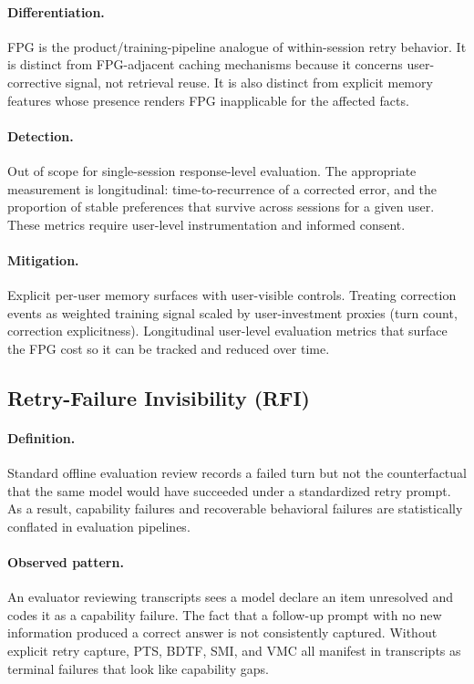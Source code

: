 \documentclass[11pt]{article}
\begin{document}
\paragraph{Differentiation.} FPG is the product/training-pipeline analogue of within-session retry behavior. It is distinct from FPG-adjacent caching mechanisms because it concerns user-corrective signal, not retrieval reuse. It is also distinct from explicit memory features whose presence renders FPG inapplicable for the affected facts.

\paragraph{Detection.} Out of scope for single-session response-level evaluation. The appropriate measurement is longitudinal: time-to-recurrence of a corrected error, and the proportion of stable preferences that survive across sessions for a given user. These metrics require user-level instrumentation and informed consent.

\paragraph{Mitigation.} Explicit per-user memory surfaces with user-visible controls. Treating correction events as weighted training signal scaled by user-investment proxies (turn count, correction explicitness). Longitudinal user-level evaluation metrics that surface the FPG cost so it can be tracked and reduced over time.

\subsection{Retry-Failure Invisibility (RFI)}
\paragraph{Definition.} Standard offline evaluation review records a failed turn but not the counterfactual that the same model would have succeeded under a standardized retry prompt. As a result, capability failures and recoverable behavioral failures are statistically conflated in evaluation pipelines.

\paragraph{Observed pattern.} An evaluator reviewing transcripts sees a model declare an item unresolved and codes it as a capability failure. The fact that a follow-up prompt with no new information produced a correct answer is not consistently captured. Without explicit retry capture, PTS, BDTF, SMI, and VMC all manifest in transcripts as terminal failures that look like capability gaps.
\end{document}
